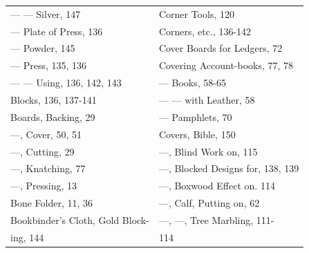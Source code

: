 \documentclass[twoside]{book}
\begin{document}
\begin{center}
\begin{tiny}
\begin{tabular}{l l}
--- --- Silver, 147            & Corner Tools, 120                     \\
--- Plate of Press, 136         & Corners, etc., 136-142                \\
--- Powder, 145                 & Cover Boards for Ledgers, 72          \\
--- Press, 135, 136             & Covering Account-books, 77, 78        \\
--- --- Using, 136, 142, 143   & --- Books, 58-65                     \\
Blocks, 136, 137-141             & --- --- with Leather, 58            \\
Boards, Backing, 29              & --- Pamphlets, 70                    \\
---, Cover, 50, 51              & Covers, Bible, 150                    \\
---, Cutting, 29                & ---, Blind Work on, 115              \\
---, Knatching, 77              & ---, Blocked Designs for, 138, 139   \\
---, Pressing, 13               & ---, Boxwood Effect on. 114          \\
Bone Folder, 11, 36              & ---, Calf, Putting on, 62            \\
Bookbinder's Cloth, Gold Block-  & ---, ---, Tree Marbling, 111-       \\
    ing, 144                     &     114                               \\

\end{tabular}

\pagebreak

\begin{tabular}{l|l}


\end{tabular}
\end{tiny}
\end{center}
\end{document}
